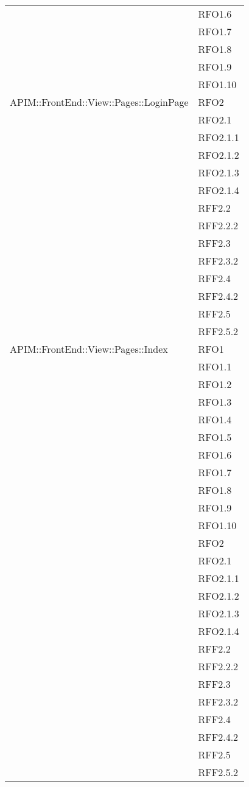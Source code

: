 \begin{longtable}{ p{12cm} | p{4cm} }
			&RFO1.6 \\
			&RFO1.7 \\
			&RFO1.8 \\
			&RFO1.9 \\
			&RFO1.10 \\
			\hline
			APIM::FrontEnd::View::Pages::LoginPage
			&RFO2 \\
			&RFO2.1 \\
			&RFO2.1.1\\
			&RFO2.1.2\\
			&RFO2.1.3\\
			&RFO2.1.4\\
			&RFF2.2\\
			&RFF2.2.2\\
			&RFF2.3\\
			&RFF2.3.2\\
			&RFF2.4\\
			&RFF2.4.2\\
			&RFF2.5\\
			&RFF2.5.2\\
			\hline
			APIM::FrontEnd::View::Pages::Index
			&RFO1 \\
			&RFO1.1 \\
			&RFO1.2 \\
			&RFO1.3 \\
			&RFO1.4 \\
			&RFO1.5 \\
			&RFO1.6 \\
			&RFO1.7 \\
			&RFO1.8 \\
			&RFO1.9 \\
			&RFO1.10 \\
			&RFO2 \\
			&RFO2.1 \\
			&RFO2.1.1\\
			&RFO2.1.2\\
			&RFO2.1.3\\
			&RFO2.1.4\\
			&RFF2.2\\
			&RFF2.2.2\\
			&RFF2.3\\
			&RFF2.3.2\\
			&RFF2.4\\
			&RFF2.4.2\\
			&RFF2.5\\
			&RFF2.5.2\\
			

\end{longtable}

